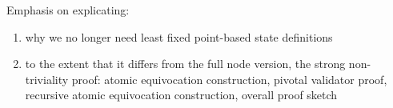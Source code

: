 Emphasis on explicating: 
\begin{enumerate}
	\item why we no longer need least fixed point-based state definitions
	\item to the extent that it differs from the full node version, the strong non-triviality proof: atomic equivocation construction, pivotal validator proof, recursive atomic equivocation construction, overall proof sketch
\end{enumerate}
